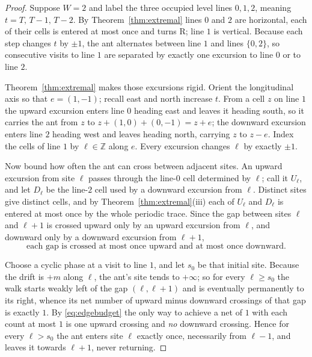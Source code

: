 \documentclass[11pt,reqno]{amsart}
\theoremstyle{plain}
\theoremstyle{definition}
\newcommand{\Z}{\mathbb{Z}}
\newcommand{\turnR}{\mathrm{R}}
\begin{document}
\begin{proof}
Suppose $W=2$ and label the three occupied level lines $0,1,2$, meaning $t=T,\,T-1,\,
T-2$. By Theorem~\ref{thm:extremal} lines $0$ and $2$ are horizontal, each of their
cells is entered at most once and turns $\turnR$; line $1$ is vertical. Because each
step changes $t$ by $\pm1$, the ant alternates between line $1$ and lines $\{0,2\}$,
so consecutive visits to line $1$ are separated by exactly one excursion to line $0$
or to line $2$.

Theorem~\ref{thm:extremal} makes those excursions rigid. Orient the longitudinal axis
so that $e=(1,-1)$; recall east and north increase $t$. From a cell $z$ on line $1$
the upward excursion
enters line $0$ heading east and leaves it heading south, so it carries the ant from
$z$ to $z+(1,0)+(0,-1)=z+e$; the downward excursion enters line $2$ heading west and
leaves heading north, carrying $z$ to $z-e$. Index the cells of line $1$ by
$\ell\in\Z$ along $e$. Every excursion changes $\ell$ by exactly $\pm1$.

Now bound how often the ant can cross between adjacent sites. An upward excursion
from site $\ell$ passes through the line-$0$ cell determined by $\ell$; call it
$U_\ell$, and let $D_\ell$ be the line-$2$ cell used by a downward excursion from
$\ell$. Distinct sites give distinct cells, and by Theorem~\ref{thm:extremal}(iii)
each of $U_\ell$ and $D_\ell$ is entered at most once by the whole periodic trace.
Since the gap between sites $\ell$ and $\ell+1$ is crossed upward only by an upward
excursion from $\ell$, and downward only by a downward excursion from $\ell+1$,
\begin{equation}\label{eq:edgebudget}
\text{each gap is crossed at most once upward and at most once downward.}
\end{equation}

Choose a cyclic phase at a visit to line $1$, and let $s_0$ be that initial site.
Because the drift is $+m$ along
$\ell$, the ant's site tends to $+\infty$; so for every $\ell\ge s_0$ the walk starts
weakly left of the gap $(\ell,\ell+1)$ and is eventually permanently to its right,
whence its net number of upward minus downward crossings of that gap is exactly $1$.
By \eqref{eq:edgebudget} the only way to achieve a net of $1$ with each count at most
$1$ is one upward crossing and \emph{no} downward crossing. Hence for every
$\ell>s_0$ the ant enters site $\ell$ exactly once, necessarily from $\ell-1$, and
leaves it towards $\ell+1$, never returning.


\end{proof}
\end{document}

